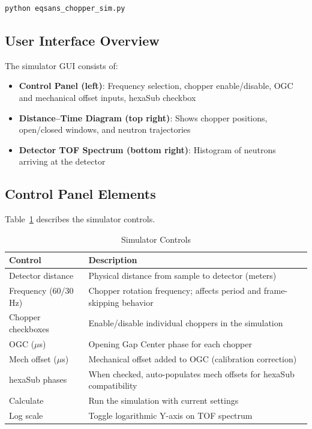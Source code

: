 \documentclass[tm]{ornltm}
\begin{document}
\begin{lstlisting}[language=bash]
python eqsans_chopper_sim.py
\end{lstlisting}

\subsection{User Interface Overview}

The simulator GUI consists of:
\begin{itemize}
    \item \textbf{Control Panel (left)}: Frequency selection, chopper enable/disable, OGC and mechanical offset inputs, hexaSub checkbox
    \item \textbf{Distance--Time Diagram (top right)}: Shows chopper positions, open/closed windows, and neutron trajectories
    \item \textbf{Detector TOF Spectrum (bottom right)}: Histogram of neutrons arriving at the detector
\end{itemize}

\subsection{Control Panel Elements}

Table~\ref{tab:sim_controls} describes the simulator controls.

\begin{table}[ht]
\centering

\caption{Simulator Controls}
\label{tab:sim_controls}
\begin{tabular}{lp{9cm}}
\toprule
Control & Description \\
\midrule
Detector distance & Physical distance from sample to detector (meters) \\
Frequency (60/30 Hz) & Chopper rotation frequency; affects period and frame-skipping behavior \\
Chopper checkboxes & Enable/disable individual choppers in the simulation \\
OGC ($\mu$s) & Opening Gap Center phase for each chopper \\
Mech offset ($\mu$s) & Mechanical offset added to OGC (calibration correction) \\
hexaSub phases & When checked, auto-populates mech offsets for hexaSub compatibility \\
Calculate & Run the simulation with current settings \\
Log scale & Toggle logarithmic Y-axis on TOF spectrum \\
\bottomrule
\end{tabular}

\end{table}
\end{document}
